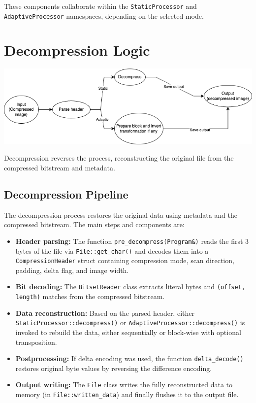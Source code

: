 \documentclass[a4paper,12pt]{article}
\begin{document}
    These components collaborate within the \texttt{StaticProcessor} and \texttt{AdaptiveProcessor} namespaces, depending on the selected mode.



    \section{Decompression Logic}

    \includegraphics[width=1\textwidth]{template-fig/decompressor}\par\vspace{1cm}

    Decompression reverses the process, reconstructing the original file from the compressed bitstream and metadata.

    \subsection*{Decompression Pipeline}

    The decompression process restores the original data using metadata and the compressed bitstream. The main steps and components are:

    \begin{itemize}
        \item \textbf{Header parsing:} The function \texttt{pre\_decompress(Program\&)} reads the first 3 bytes of the file via \texttt{File::get\_char()} and decodes them into a \texttt{CompressionHeader} struct containing compression mode, scan direction, padding, delta flag, and image width.

        \item \textbf{Bit decoding:} The \texttt{BitsetReader} class extracts literal bytes and \texttt{(offset, length)} matches from the compressed bitstream.

        \item \textbf{Data reconstruction:} Based on the parsed header, either \texttt{StaticProcessor::decompress()} or \texttt{AdaptiveProcessor::decompress()} is invoked to rebuild the data, either sequentially or block-wise with optional transposition.

        \item \textbf{Postprocessing:} If delta encoding was used, the function \texttt{delta\_decode()} restores original byte values by reversing the difference encoding.

        \item \textbf{Output writing:} The \texttt{File} class writes the fully reconstructed data to memory (in \texttt{File::written\_data}) and finally flushes it to the output file.
    \end{itemize}
\end{document}
